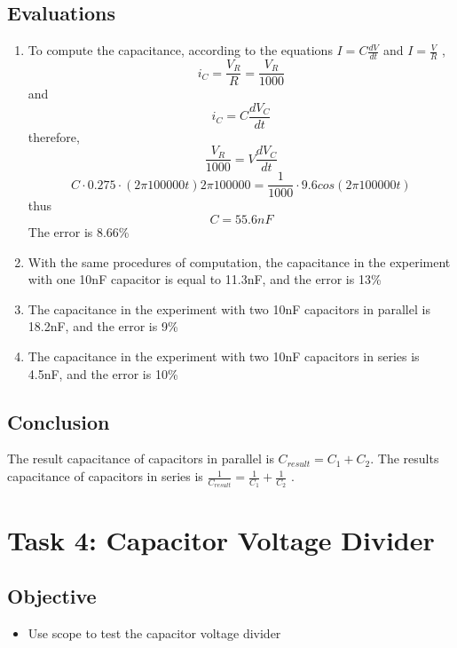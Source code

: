 \documentclass[journal, letterpaper]{IEEEtran}
\begin{document}
    \subsection{Evaluations}
    \begin{enumerate}
    \item To compute the capacitance, according to the equations $I = C\frac{dV}{dt}$ and $I = \frac{V}{R}$ , $$i_C = \frac{V_R}{R} = \frac{V_R}{1000}$$and $$i_C = C\frac{dV_C}{dt}$$ therefore, $$\frac{V_R}{1000} = V\frac{dV_C}{dt}$$ $$C\cdot0.275\cdot(2\pi100000t)2\pi100000 = \frac{1}{1000}\cdot9.6cos(2\pi100000t)$$thus $$C = 55.6nF$$ The error is 8.66\%
\item With the same procedures of computation, the capacitance in the experiment with one 10nF capacitor is equal to 11.3nF, and the error is 13\%
\item The capacitance in the experiment with two 10nF capacitors in parallel is 18.2nF, and the error is 9\%
\item The capacitance in the experiment with two 10nF capacitors in series is 4.5nF, and the error is 10\%
        \end{enumerate}
    \subsection{Conclusion}
	The result capacitance of capacitors in parallel is $C_{result} = C_1 + C_2$. The results capacitance of capacitors in series is $\frac{1}{C_{result}} = \frac{1}{C_1} + \frac{1}{C_2}$ . 
\section{\textbf{Task 4: Capacitor Voltage Divider}}
	\subsection{Objective}
    \begin{itemize}
    \item Use scope to test the capacitor voltage divider
    \end{itemize}
    
\newpage
\end{document}
